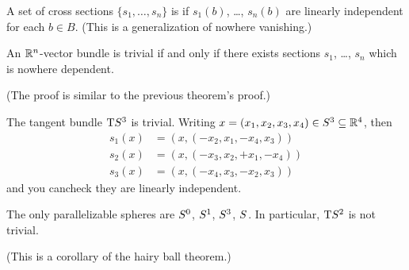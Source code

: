 \begin{definition}
A set of cross sections $\{s_{1},\dots,s_{n}\}$ is 
if $s_{1}(b)$, \dots, $s_{n}(b)$ are linearly independent for each
$b\in B$. (This is a generalization of nowhere vanishing.)
\end{definition}

\begin{theorem}
An $\mathbb{R}^{n}$-vector bundle is trivial if and only if there exists
sections $s_{1}$, \dots, $s_{n}$ which is nowhere dependent.
\end{theorem}

(The proof is similar to the previous theorem's proof.)

\begin{example}
The tangent bundle $\mathrm{T}S^{3}$ is trivial. Writing $x=(x_{1},x_{2},x_{3},x_{4})\in S^{3}\subseteq\mathbb{R}^{4}$,
then
\begin{subequations}
  \begin{align}
s_{1}(x) &= (x, (-x_{2},x_{1},-x_{4},x_{3}))\\
s_{2}(x) &= (x, (-x_{3},x_{2},+x_{1},-x_{4}))\\
s_{3}(x) &= (x, (-x_{4},x_{3},-x_{2},x_{3}))
  \end{align}
\end{subequations}
and you cancheck they are linearly independent.
\end{example}

\begin{theorem}
The only parallelizable spheres are $S^{0}$, $S^{1}$,
$S^{3}$, $S^{}$. In particular, $\mathrm{T}S^{2}$ is not trivial.
\end{theorem}

(This is a corollary of the hairy ball theorem.)
